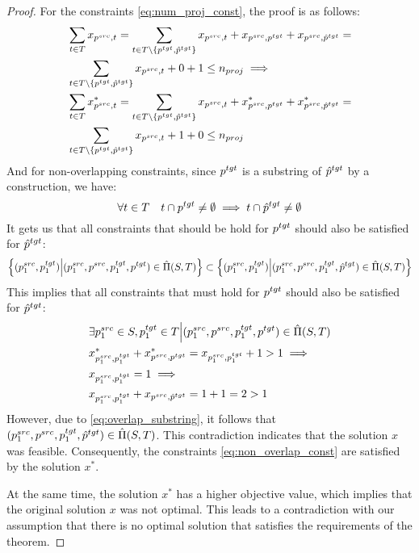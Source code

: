 \begin{proof}
  For the constraints \eqref{eq:num_proj_const}, the proof is as follows:
  \begin{align*}
    & \sum\limits_{t \in T} x_{p^{src}, t} =
    \sum\limits_{t \in T \setminus \{ p^{tgt}, \hat{p}^{tgt} \}} x_{p^{src}, t} + x_{p^{src}, p^{tgt}} + x_{p^{src}, \hat{p}^{tgt}}  =     \\
    & \sum\limits_{t \in T \setminus \{ p^{tgt}, \hat{p}^{tgt} \}} x_{p^{src}, t} + 0 + 1
    \leq n_{proj} \implies                                                                                                                 \\
    & \sum\limits_{t \in T} x^*_{p^{src}, t} =
    \sum\limits_{t \in T \setminus \{ p^{tgt}, \hat{p}^{tgt} \}} x_{p^{src}, t} + x^*_{p^{src}, p^{tgt}} + x^*_{p^{src}, \hat{p}^{tgt}}  = \\
    & \sum\limits_{t \in T \setminus \{ p^{tgt}, \hat{p}^{tgt} \}} x_{p^{src}, t} + 1 + 0 \leq n_{proj}
  \end{align*}
  And for non-overlapping constraints, since \( p^{tgt} \) is a substring of \( \hat{p}^{tgt} \) by a
  construction, we have:
  \[
    \forall t \in T \quad t \cap p^{tgt} \neq \emptyset \implies t \cap \hat{p}^{tgt} \neq \emptyset
  \]
  It gets us that all constraints that should be hold for \( p^{tgt} \) should also be satisfied for \( \hat{p}^{tgt} \):
  \begin{equation} \label{eq:overlap_substring}
    \left\{ (p_1^{src}, p_1^{tgt}) \Big| (p_1^{src}, p^{src}, p_1^{tgt}, p^{tgt}) \in \hat{\Pi}(S, T) \right\} \subset
    \left\{ (p_1^{src}, p_1^{tgt}) \Big| (p_1^{src}, p^{src}, p_1^{tgt}, \hat{p}^{tgt}) \in \hat{\Pi}(S, T) \right\}
  \end{equation}
  This implies that all constraints that must hold for \( p^{tgt} \) should also be satisfied for \( \hat{p}^{tgt} \):
  \begin{align*}
    & \exists p_1^{src} \in S, p_1^{tgt} \in T \Big| (p_1^{src}, p^{src}, p_1^{tgt}, p^{tgt}) \in \hat{\Pi}(S, T) \\
    & x^*_{p_1^{src}, p_1^{tgt}} + x^*_{p^{src}, p^{tgt}} =
    x_{p_1^{src}, p_1^{tgt}} + 1 > 1 \implies                                                                      \\
    & x_{p_1^{src}, p_1^{tgt}} = 1
    \implies                                                                                                       \\
    & x_{p_1^{src}, p_1^{tgt}} + x_{p^{src}, \hat{p}^{tgt}} = 1 + 1 = 2 > 1
  \end{align*}
  However, due to \eqref{eq:overlap_substring}, it follows that
  \( (p_1^{src}, p^{src}, p_1^{tgt}, \hat{p}^{tgt}) \in \hat{\Pi}(S, T) \).
  This contradiction indicates that the solution \( x \) was feasible.
  Consequently, the constraints \eqref{eq:non_overlap_const} are satisfied by the
  solution \( x^* \).

  At the same time, the solution \( x^* \) has a higher objective value, which
  implies that the original solution \( x \) was not optimal. This leads to a
  contradiction with our assumption that there is no optimal solution that satisfies
  the requirements of the theorem.
\end{proof}
